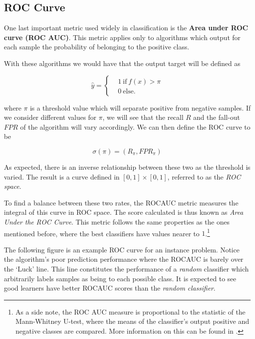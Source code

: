 
\subsection{ROC Curve}

One last important metric used widely in classification is the \textbf{Area under ROC curve (ROC AUC)}. This metric applies only to algorithms which output for each sample the probability of belonging to the positive class.

With these algorithms we would have that the output target will be defined as

\begin{equation}
\hat{y} =
\begin{cases}
&1 \ \mbox{if} \ f(x) > \pi \\
&0 \ \mbox{else}.
\end{cases}
\end{equation}

where $\pi$ is a threshold value which will separate positive from negative samples. If we consider different values for $\pi$, we will see that the recall $R$ and the fall-out $FPR$ of the algorithm will vary accordingly. We can then define the ROC curve to be

\begin{equation}
\sigma(\pi) = (R_\pi, FPR_\pi)
\end{equation}

As expected, there is an inverse relationship between these two as the threshold is varied. The result is a curve defined in $[0,1]\times[0,1]$, referred to as the \textit{ROC space}.

To find a balance between these two rates, the ROCAUC metric measures the integral of this curve in ROC space. The score calculated is thus known as \textit{Area Under the ROC Curve}. This metric follows the same properties as the ones mentioned before, where the best classifiers have values nearer to $1$.\footnote{As a side note, the ROC AUC measure is proportional to the statistic of the Mann-Whitney U-test, where the means of the classifier's output positive and negative classes are compared. More information on this can be found in \textcite{mason-rocAucRelationship}.}



The following figure is an example ROC curve for an instance problem. Notice the algorithm's poor prediction performance where the ROCAUC is barely over the `Luck' line. This line constitutes the performance of a \textit{random} classifier which arbitrarily labels samples as being to each possible class. It is expected to see good learners have better ROCAUC scores than the \textit{random classifier}.

